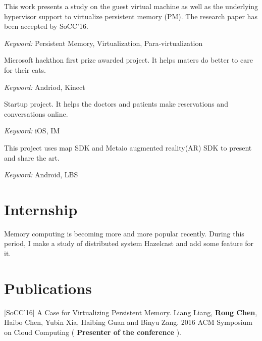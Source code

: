 \documentclass{resume}
\begin{document}
This work presents a study on the guest virtual machine as well as the underlying hypervisor support to virtualize persistent memory (PM). 
The research paper has been accepted by SoCC'16.

\textit{Keyword: } Persistent Memory, Virtualization, Para-virtualization



Microsoft hackthon first prize awarded project.
It helps maters do better to care for their cats.

\textit{Keyword: } Andriod, Kinect


Startup project. It helps the doctors and patients make reservations and conversations online. 

\textit{Keyword: } iOS, IM

This project uses map SDK and Metaio augmented reality(AR) SDK to present and share the art. 

\textit{Keyword: } Android, LBS


\section{Internship}
Memory computing is becoming more and more popular recently. During this period, I make a study of distributed system Hazelcast and add some feature for it.


\section{Publications}
[SoCC'16] A Case for Virtualizing Persistent Memory. Liang Liang, \textbf{Rong Chen}, Haibo Chen, Yubin Xia, Haibing Guan and Binyu Zang. 2016 ACM Symposium on Cloud Computing ( \textbf{Presenter of the conference} ).
\end{document}
